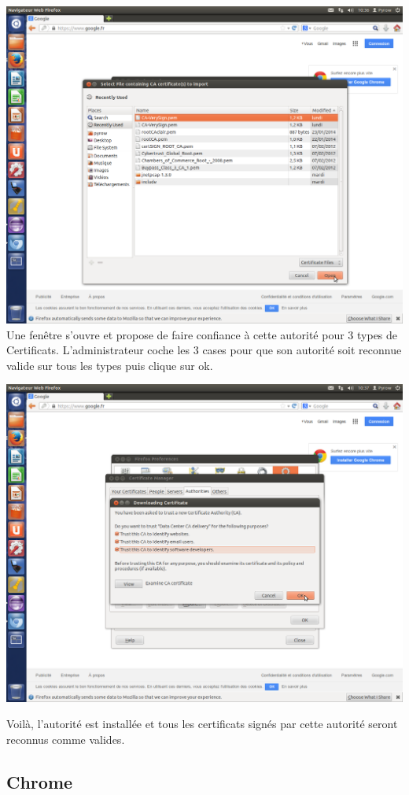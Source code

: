 \documentclass[a4paper,11pt,french]{book}
\begin{document}
\includegraphics[width=\textwidth]{images/OngletImport.png}
\newpage
Une fenêtre s'ouvre et propose de faire confiance à cette autorité pour 3 types de Certificats. L'administrateur coche les 3 cases pour que son autorité soit reconnue valide sur tous les types puis clique sur ok.

\includegraphics[width=\textwidth]{images/OngletConfirm.png} 


Voilà, l'autorité est installée et tous les certificats signés par cette autorité seront reconnus comme valides.
\newpage
\subsection{Chrome}
\end{document}
